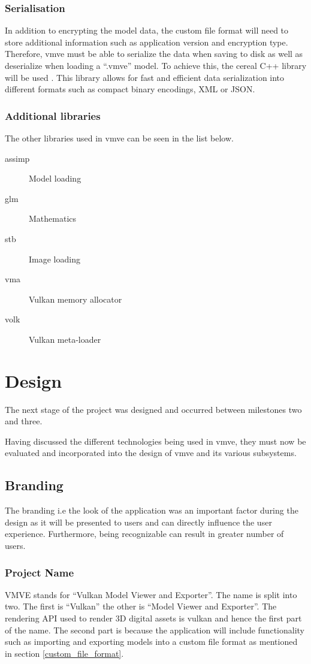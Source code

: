 \documentclass[11pt]{article}
\begin{document}
\subsubsection{Serialisation}
In addition to encrypting the model data, the custom file format will need to
store additional information such as application version and encryption type.
Therefore, \gls{vmve} must be able to serialize the data when saving to disk as
well as deserialize when loading a ``.vmve'' model. To achieve this, the cereal
C++ library will be used \cite{cereal}. This library allows for fast and
efficient data serialization into different formats such as compact binary
encodings, XML or JSON.

\subsubsection{Additional libraries}
The other libraries used in \gls{vmve} can be seen in the list below.
\begin{description}
  \item[assimp] Model loading
  \item[glm] Mathematics
  \item[stb] Image loading
  \item[vma] Vulkan memory allocator
  \item[volk] Vulkan meta-loader
\end{description}

\clearpage
\section{Design}
The next stage of the project was designed and occurred between milestones two
and three. 

Having discussed the different technologies being used in \gls{vmve}, they must
now be evaluated and incorporated into the design of \gls{vmve} and its various
subsystems.

\subsection{Branding}
The branding i.e the look of the application was an important factor during the
design as it will be presented to users and can directly influence the user
experience. Furthermore, being recognizable can result in greater number of
users.

\subsubsection{Project Name}
VMVE stands for ``Vulkan Model Viewer and Exporter''. The name is split into
two. The first is ``Vulkan'' the other is ``Model Viewer and Exporter''. The
rendering API used to render 3D digital assets is \gls{vulkan} and hence the
first part of the name. The second part is because the application will include
functionality such as importing and exporting models into a custom file format
as mentioned in section \ref{custom_file_format}.
\end{document}
